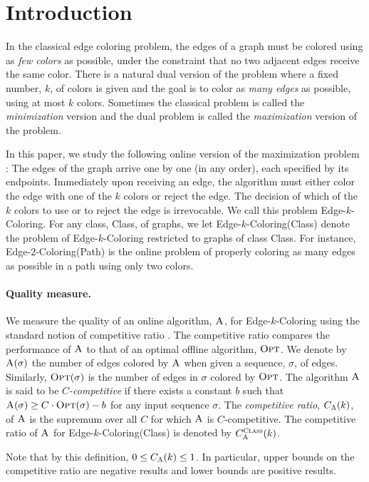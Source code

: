 \documentclass[smallextended]{svjour3}
\def\mck{{\sc Edge-$k$-Coloring}\xspace}
\def\mcpath{{\sc Edge-$2$-Coloring(Path)}\xspace}
\def\mcclass{{\sc Edge-$k$-Coloring(Class)}\xspace}
\newcommand{\OPT}{\ensuremath{\operatorname{\textsc{Opt}}}\xspace}
\newcommand{\ALG}{\ensuremath{\operatorname{\textsc{A}}}\xspace}
\begin{document}
\section{Introduction}
In the classical edge coloring problem, the edges of a graph must be
 colored using as {\em few colors} as possible, under the constraint that no
 two adjacent edges receive the same color.
There is a natural dual version of the problem where a fixed number, $k$, of
 colors is given and the goal is to color as {\em many edges} as possible,
 using at most $k$ colors.
Sometimes the classical problem is called the {\em minimization} version and
 the dual problem is called the {\em maximization} version of the problem.

In this paper, we study the following online version of the maximization problem \cite{kedge}: The edges of the graph arrive one by one (in any order), each specified by its endpoints. Immediately upon receiving an edge, the algorithm must either color
 the edge with one of the $k$ colors or reject the edge. 
The decision of which of the $k$ colors to use or to reject the edge
 is irrevocable. 
We call this problem \mck. 
For any class, {\sc Class}, of graphs, we let \mcclass denote the problem
 of \mck restricted to graphs of class {\sc Class}.
For instance, \mcpath is the online problem of properly coloring as many edges
 as possible in a path using only two colors.

\paragraph{Quality measure.}
We measure the quality of an online algorithm, $\ALG$, for \mck using
the standard notion of competitive ratio \cite{CompRatio1,
  CompRatio2}. The competitive ratio compares the performance of
$\ALG$ to that of an optimal offline algorithm, $\OPT$. We denote by
$\ALG(\sigma)$ the number of edges colored by $\ALG$ when given a
sequence, $\sigma$, of edges. Similarly, $\OPT(\sigma)$ is the number
of edges in $\sigma$ colored by $\OPT$. The algorithm $\ALG$ is said
to be \emph{$C$-competitive} if there exists a constant $b$ such that
$\ALG(\sigma)\geq C\cdot \OPT (\sigma) -b$ for any input sequence
$\sigma$. The \emph{competitive ratio}, $C_{\ALG}(k)$, of $\ALG$ is
the supremum over all $C$ for which $\ALG$ is $C$-competitive. 
The competitive ratio of $\ALG$ for \mcclass is denoted by
 $C_{\ALG}^{\text{{\sc Class}}}(k)$.

Note that by this definition, $0\leq C_{\ALG}(k)\leq 1$. In particular, upper bounds on the competitive ratio are negative results and lower bounds are positive results.
\end{document}
